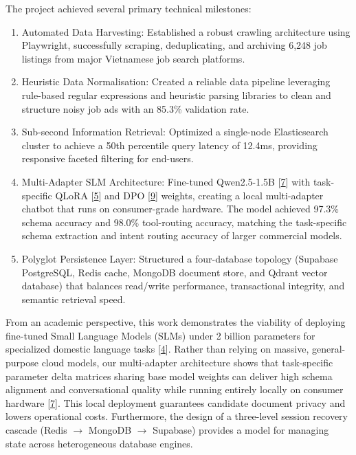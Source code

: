 \documentclass[12pt, a4paper]{report}
\begin{document}
The project achieved several primary technical milestones:
\begin{enumerate}
    \item Automated Data Harvesting: Established a robust crawling architecture using Playwright, successfully scraping, deduplicating, and archiving 6,248 job listings from major Vietnamese job search platforms.
    \item Heuristic Data Normalisation: Created a reliable data pipeline leveraging rule-based regular expressions and heuristic parsing libraries to clean and structure noisy job ads with an 85.3\% validation rate.
    \item Sub-second Information Retrieval: Optimized a single-node Elasticsearch cluster to achieve a 50th percentile query latency of 12.4ms, providing responsive faceted filtering for end-users.
    \item Multi-Adapter SLM Architecture: Fine-tuned Qwen2.5-1.5B [\hyperlink{cite7}{7}] with task-specific QLoRA [\hyperlink{cite5}{5}] and DPO [\hyperlink{cite9}{9}] weights, creating a local multi-adapter chatbot that runs on consumer-grade hardware. The model achieved 97.3\% schema accuracy and 98.0\% tool-routing accuracy, matching the task-specific schema extraction and intent routing accuracy of larger commercial models.
    \item Polyglot Persistence Layer: Structured a four-database topology (Supabase PostgreSQL, Redis cache, MongoDB document store, and Qdrant vector database) that balances read/write performance, transactional integrity, and semantic retrieval speed.
\end{enumerate}

\vspace{0.6cm}
\vspace{0.3cm}

From an academic perspective, this work demonstrates the viability of deploying fine-tuned Small Language Models (SLMs) under 2 billion parameters for specialized domestic language tasks [\hyperlink{cite4}{4}]. Rather than relying on massive, general-purpose cloud models, our multi-adapter architecture shows that task-specific parameter delta matrices sharing base model weights can deliver high schema alignment and conversational quality while running entirely locally on consumer hardware [\hyperlink{cite7}{7}]. This local deployment guarantees candidate document privacy and lowers operational costs. Furthermore, the design of a three-level session recovery cascade (Redis $\rightarrow$ MongoDB $\rightarrow$ Supabase) provides a model for managing state across heterogeneous database engines.
\end{document}
